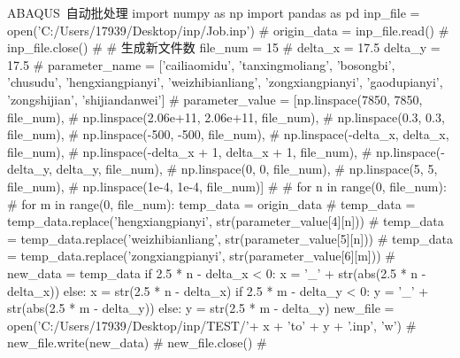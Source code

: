 \documentclass[color=orange,openany]{textbook-cn}
\begin{document}
\begin{PythonBox}{ABAQUS~自动批处理}
import numpy as np
import pandas as pd
inp_file = open('C:/Users/17939/Desktop/inp/Job.inp') # 
origin_data = inp_file.read() # 
inp_file.close() # 
# 生成新文件数
file_num = 15
# 
delta_x = 17.5
delta_y = 17.5
# 
parameter_name = ['cailiaomidu', 'tanxingmoliang', 'bosongbi', 
                  'chusudu', 'hengxiangpianyi', 'weizhibianliang', 
                  'zongxiangpianyi', 'gaodupianyi', 'zongshijian', 'shijiandanwei']
# 
parameter_value = [np.linspace(7850, 7850, file_num), # 
                   np.linspace(2.06e+11, 2.06e+11, file_num), # 
                   np.linspace(0.3, 0.3, file_num), # 
                   np.linspace(-500, -500, file_num), # 
                   np.linspace(-delta_x, delta_x, file_num), # 
                   np.linspace(-delta_x + 1, delta_x + 1, file_num), # 
                   np.linspace(-delta_y, delta_y, file_num), # 
                   np.linspace(0, 0, file_num), # 
                   np.linspace(5, 5, file_num), # 
                   np.linspace(1e-4, 1e-4, file_num)] # 
# 
for n in range(0, file_num): # 
    for m in range(0, file_num):
        temp_data = origin_data # 
        temp_data = temp_data.replace('hengxiangpianyi', str(parameter_value[4][n])) # 
        temp_data = temp_data.replace('weizhibianliang', str(parameter_value[5][n])) # 
        temp_data = temp_data.replace('zongxiangpianyi', str(parameter_value[6][m])) # 
        new_data = temp_data
        if 2.5 * n - delta_x < 0:
            x = '_' + str(abs(2.5 * n - delta_x))
        else:
            x = str(2.5 * n - delta_x)
        if 2.5 * m - delta_y < 0:
            y = '_' + str(abs(2.5 * m - delta_y))
        else:
            y = str(2.5 * m - delta_y)
        new_file = open('C:/Users/17939/Desktop/inp/TEST/'+ x + 'to' + y + '.inp', 'w') # 
        new_file.write(new_data) # 
        new_file.close() # 
\end{PythonBox}


\begin{Proposition*}[命题名称命题名称命题名称命题名称命题名称]
\zhlipsum[2]
\end{Proposition*}


\lipsum

\lipsum
\end{document}
